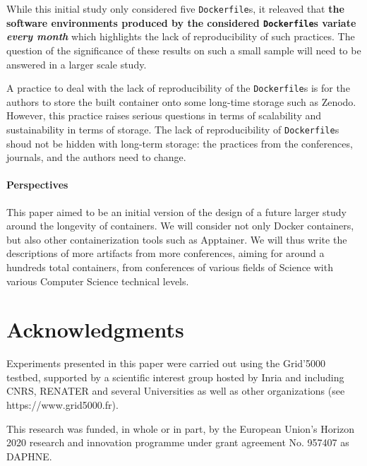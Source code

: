 \documentclass[sigconf,natbib=false]{acmart}
\newcommand{\df}{\texttt{Dockerfile}}
\begin{document}
While this initial study only considered five \df s, it releaved that \textbf{the software environments produced by the considered \df s variate \emph{every month}} which highlights the lack of reproducibility of such practices.
The question of the significance of these results on such a small sample will need to be answered in a larger scale study.

A practice to deal with the lack of reproducibility of the \df s is for the authors to store the built container onto some long-time storage such as Zenodo.
However, this practice raises serious questions in terms of scalability and sustainability in terms of storage.
The lack of reproducibility of \df s shoud not be hidden with long-term storage: the practices from the conferences, journals, and the authors need to change.

\paragraph{Perspectives}

This paper aimed to be an initial version of the design of a future larger study around the longevity of containers.
We will consider not only Docker containers, but also other containerization tools such as Apptainer.
We will thus write the descriptions of more artifacts from more conferences, aiming for around a hundreds total containers, from conferences of various fields of Science with various Computer Science technical levels.


%

\section*{Acknowledgments}


Experiments presented in this paper were carried out using the Grid'5000 testbed, supported by a scientific interest group hosted by Inria and including CNRS, RENATER and several Universities as well as other organizations (see https://www.grid5000.fr). 

This research was funded, in whole or in part, by the European Union’s Horizon 2020 research and innovation programme under grant agreement No. 957407 as DAPHNE.


\newpage
\newpage
%
%
\printbibliography
\end{document}
